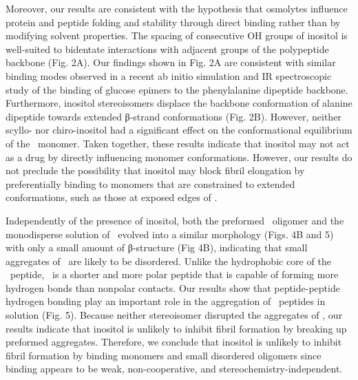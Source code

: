 Moreover, our results are consistent with the hypothesis that osmolytes influence protein and peptide folding and stability through direct binding rather than by modifying solvent properties.\cite{Canchi:2011p53,Lee:2010p59,Street:2006p21} The spacing of consecutive OH groups of inositol is well-suited to bidentate interactions with adjacent groups of the polypeptide backbone (Fig. 2A). Our findings shown in Fig. 2A are consistent with similar binding modes observed in a recent ab initio simulation and IR spectroscopic study of the binding of glucose epimers to the phenylalanine dipeptide backbone.\cite{Cocinero:2011p54} Furthermore, inositol stereoisomers displace the backbone conformation of alanine dipeptide towards extended β-strand conformations (Fig. 2B). However, neither scyllo- nor chiro-inositol had a significant effect on the conformational equilibrium of the \gafour\ monomer. Taken together, these results indicate that inositol may not act as a drug by directly influencing monomer conformations. However, our results do not preclude the possibility that inositol may block fibril elongation by preferentially binding to monomers that are constrained to extended conformations, such as those at exposed edges of \bsheets.

Independently of the presence of inositol, both the preformed \bsheet\ oligomer and the monodisperse solution of \gafour\ evolved into a similar morphology (Figs. 4B and 5) with only a small amount of β-structure (Fig 4B), indicating that small aggregates of \gafour\ are likely to be disordered. Unlike the hydrophobic core of the \abeta\ peptide, \gafour\ is a shorter and more polar peptide that is capable of forming more hydrogen bonds than nonpolar contacts. Our results show that peptide-peptide hydrogen bonding play an important role in the aggregation of \gafour\ peptides in solution (Fig. 5). Because neither stereoisomer disrupted the aggregates of \gafour, our results indicate that inositol is unlikely to inhibit fibril formation by breaking up preformed aggregates. Therefore, we conclude that inositol is unlikely to inhibit fibril formation by binding monomers and small disordered oligomers since binding appears to be weak, non-cooperative, and stereochemistry-independent.

